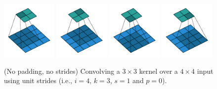 \documentclass[notitlepage]{report}
\begin{document}
\begin{figure}[p]
    \centering
    \includegraphics[width=0.24\textwidth]{pdf/no_padding_no_strides_00.pdf}
    \includegraphics[width=0.24\textwidth]{pdf/no_padding_no_strides_01.pdf}
    \includegraphics[width=0.24\textwidth]{pdf/no_padding_no_strides_02.pdf}
    \includegraphics[width=0.24\textwidth]{pdf/no_padding_no_strides_03.pdf}
    \caption{\label{fig:no_padding_no_strides} (No padding, no strides)
        Convolving a $3 \times 3$ kernel over a $4 \times 4$ input using unit
        strides (i.e., $i = 4$, $k = 3$, $s = 1$ and $p = 0$).}
\end{figure}
\end{document}
